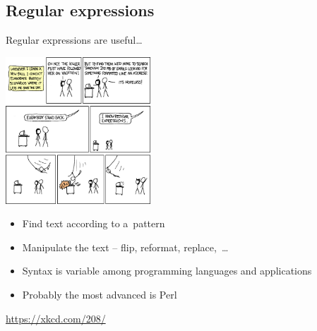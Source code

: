 \documentclass[compress, ucs, xelatex, 11pt, xcolor=svgnames,
  hyperref={
    bookmarks=true,
    unicode=true,
    colorlinks=true,
    pdftitle={Linux, command line and MetaCentrum},
    plainpages=false,
    pdfauthor={Vojtech Zeisek},
    pdfsubject={Course about use of Linux command line, writing shell scripts and using MetaCentrum of CESNET},
    pdfcreator={XeLaTeX},
    pdfkeywords={Linux, GNU, BASH, shell, command line, MetaCentrum},
    linkcolor=Red,
    anchorcolor=Blue,
    citecolor=Purple,
    filecolor=DodgerBlue,
    menucolor=DarkOrchid,
    urlcolor=DeepSkyBlue,
    pdftex},
  url={hyphens, lowtilde} %
  ]{beamer}
\begin{document}
\subsection{Regular expressions}

\begin{frame}{Regular expressions are useful\ldots}
  \begin{multicols}{2}
    \begin{center}
      \includegraphics[height=5.5cm]{regular_expressions.png}
    \end{center}
    \columnbreak
    \begin{itemize}
      \item Find text according to a~pattern
      \item Manipulate the text -- flip, reformat, replace,~\ldots
      \item Syntax is variable among programming languages and applications
      \item Probably the most advanced is Perl
    \end{itemize}
    \vfill
    \url{https://xkcd.com/208/}
  \end{multicols}
\end{frame}
\end{document}
